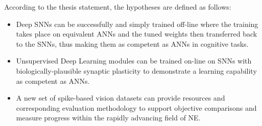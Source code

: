 According to the thesis statement, the hypotheses are defined as follows: 
\begin{itemize}
%

	\item 
	Deep SNNs can be successfully and simply trained off-line where the training takes place on equivalent ANNs and the tuned weights then transferred back to the SNNs, thus making them as competent as ANNs in cognitive tasks.
	

	\item 
	Unsupervised Deep Learning modules can be trained on-line on SNNs with biologically-plausible synaptic plasticity to demonstrate a learning capability as competent as ANNs.


	\item 
	A new set of spike-based vision datasets can provide resources and corresponding evaluation methodology to support objective comparisons and measure progress within the rapidly advancing field of NE.

\end{itemize}


